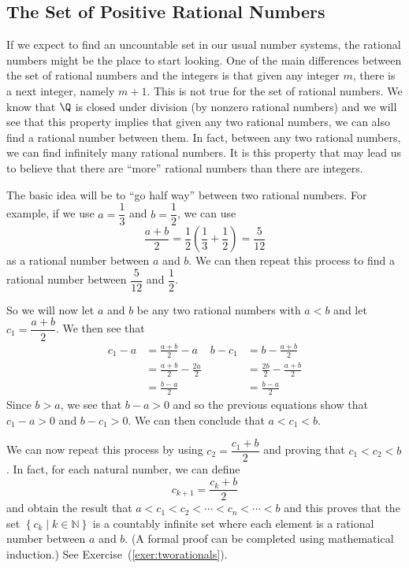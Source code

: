 \subsection*{The Set of Positive Rational Numbers}
If we expect to find an uncountable set in our usual number systems, the rational numbers might be the place to start looking.  One of the main differences between the set of rational numbers and the integers is that given any integer $m$, there is a next integer, namely $m + 1$.  This is not true for the set of rational numbers.  We know that $\Q$ is closed under division (by nonzero rational numbers) and we will see that this property implies that given any two rational numbers, we can also find a rational number between them.  In fact, between any two rational numbers, we can find infinitely many rational numbers.  It is this property that may lead us to believe that there are ``more'' rational numbers than there are integers.

The basic idea will be to ``go half way'' between two rational numbers.  For example, if we use $a = \dfrac{1}{3}$ and $b = \dfrac{1}{2}$, we can use
\[
\frac{a+b}{2} = \frac{1}{2} \left( \frac{1}{3} + \frac{1}{2} \right) = \frac{5}{12}
\]
as a rational number between $a$ and $b$.  We can then repeat this process to find a rational number between 
$\dfrac{5}{12}$ and $\dfrac{1}{2}$.

So we will now let $a$ and $b$ be any two rational numbers with $a < b$ and let $c_1 = \dfrac{a+b}{2}$.  We then see that%
\label{tworationals}%
\begin{align*}
c_1 - a &= \frac{a+b}{2} - a &  b- c_1 &= b - \frac{a+b}{2} \\
        &= \frac{a+b}{2} - \frac{2a}{2} &  &= \frac{2b}{2} - \frac{a+b}{2} \\
        &= \frac{b-a}{2}                &  &= \frac{b-a}{2}
\end{align*}
Since $b > a$, we see that $b - a > 0$ and so the previous equations show that $c_1 - a > 0$ and $b - c_1 > 0$.  We can then conclude that $a < c_1 < b$.

We can now repeat this process by using $c_2 = \dfrac{c_1 + b}{2}$ and proving that $c_1 < c_2 < b$.  In fact, for each natural number, we can define
\[
c_{k + 1} = \frac{c_k + b}{2}
\]
and obtain the result that $a < c_1 < c_2 < \cdots < c_n < \cdots < b$ and this proves that the set 
$\left\{ c_k \mid k \in \mathbb{N} \right\}$ is a countably infinite set where each element is a rational number between $a$ and $b$.  (A formal proof can be completed using mathematical induction.)  See Exercise~(\ref{exer:tworationals}).

